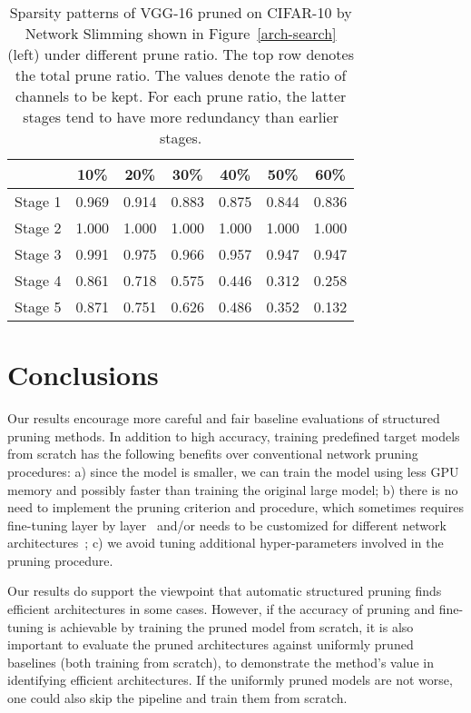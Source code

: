 \setlength{\tabcolsep}{5pt}
\renewcommand{\arraystretch}{1.2}
\begin{table}[!htbp]
\centering
\small
\begin{tabular}{c|cccccc}
\hline
      & 10\%   & 20\%   & 30\%   & 40\%   & 50\%   & 60\%   \\ \hline
Stage 1 & 0.969 & 0.914 & 0.883 & 0.875 & 0.844 &
0.836 \\
Stage 2 & 1.000 & 1.000 & 1.000 & 1.000 & 1.000 &
1.000 \\
Stage 3 & 0.991 & 0.975 & 0.966 & 0.957 & 0.947 & 0.947 \\
Stage 4 & 0.861 & 0.718 & 0.575 & 0.446 & 0.312 & 0.258 \\
Stage 5 & 0.871 & 0.751 & 0.626 & 0.486 & 0.352 & 0.132 \\ \hline
\end{tabular}
    \caption{
      Sparsity patterns of VGG-16 pruned on CIFAR-10 by Network Slimming shown in Figure~\ref{arch-search} (left) under different prune ratio. The top row denotes the total prune ratio. The values denote the ratio of channels to be kept. For each prune ratio, the latter stages tend to have more redundancy than earlier stages.}
     \label{sparsity-2}
\end{table}


\section{Conclusions}
Our results encourage more careful and fair baseline evaluations of structured pruning methods. In addition to high accuracy, training predefined target models from scratch has the following benefits over conventional network pruning procedures:
a) since the model is smaller, we can train the model using less GPU memory and possibly faster than training the original large model;
b) there is no need to implement the pruning criterion and procedure, which sometimes  requires fine-tuning layer by layer~\cite{luo2017thinet} and/or needs to be customized for different network architectures~\cite{li2016pruning, liu2017learning};
c) we avoid tuning additional hyper-parameters involved in the pruning procedure.

 Our results do support the viewpoint that  automatic structured pruning finds efficient architectures in some cases. However, if the accuracy of pruning and fine-tuning is achievable by training the pruned model from scratch, it is also important to evaluate the pruned architectures against uniformly pruned baselines (both training from scratch), to demonstrate the method's value in identifying efficient architectures. If the uniformly pruned models are not worse, one could also skip the pipeline and train them from scratch.

